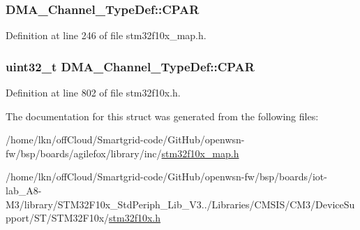 \subsubsection[{\texorpdfstring{C\+P\+AR}{CPAR}}]{ D\+M\+A\+\_\+\+Channel\+\_\+\+Type\+Def\+::\+C\+P\+AR}\hypertarget{struct_d_m_a___channel___type_def_a9048b83bbc6d2dea62503b6e334257be}{}\label{struct_d_m_a___channel___type_def_a9048b83bbc6d2dea62503b6e334257be}


Definition at line 246 of file stm32f10x\+\_\+map.\+h.

\subsubsection[{\texorpdfstring{C\+P\+AR}{CPAR}}]{ {\bf uint32\+\_\+t} D\+M\+A\+\_\+\+Channel\+\_\+\+Type\+Def\+::\+C\+P\+AR}\hypertarget{struct_d_m_a___channel___type_def_a8ce1c9c2742eaaa0e97ddbb3a06154cc}{}\label{struct_d_m_a___channel___type_def_a8ce1c9c2742eaaa0e97ddbb3a06154cc}


Definition at line 802 of file stm32f10x.\+h.



The documentation for this struct was generated from the following files\+:\begin{DoxyCompactItemize}
\item 
/home/lkn/off\+Cloud/\+Smartgrid-\/code/\+Git\+Hub/openwsn-\/fw/bsp/boards/agilefox/library/inc/\hyperlink{agilefox_2library_2inc_2stm32f10x__map_8h}{stm32f10x\+\_\+map.\+h}\item 
/home/lkn/off\+Cloud/\+Smartgrid-\/code/\+Git\+Hub/openwsn-\/fw/bsp/boards/iot-\/lab\+\_\+\+A8-\/\+M3/library/\+S\+T\+M32\+F10x\+\_\+\+Std\+Periph\+\_\+\+Lib\+\_\+\+V3../\+Libraries/\+C\+M\+S\+I\+S/\+C\+M3/\+Device\+Support/\+S\+T/\+S\+T\+M32\+F10x/\hyperlink{iot-lab___a8-_m3_2library_2_s_t_m32_f10x___std_periph___lib___v3_85_80_2_libraries_2_c_m_s_i_s_26497265545392eb5694b064ae15018db}{stm32f10x.\+h}\end{DoxyCompactItemize}
